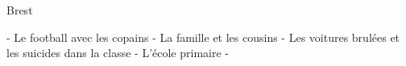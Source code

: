 Brest

- Le football avec les copains
- La famille et les cousins
- Les voitures brulées et les suicides dans la classe
- L'école primaire
- 
